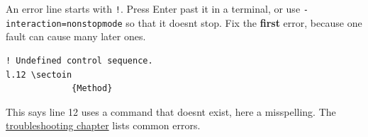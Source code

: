 An error line starts with \texttt{!}. Press Enter past it in a terminal, or use \texttt{-interaction=nonstopmode} so that it doesn\textquotesingle t stop. Fix the \textbf{first} error, because one fault can cause many later ones.

\begin{lstlisting}[language=text]
! Undefined control sequence.
l.12 \sectoin
             {Method}
\end{lstlisting}

This says line 12 uses a command that doesn\textquotesingle t exist, here a misspelling. The \href{../troubleshooting/}{troubleshooting chapter} lists common errors.

